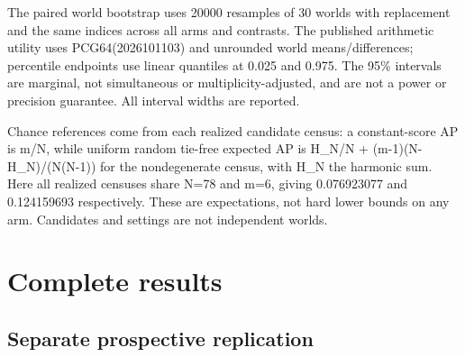 \documentclass{article}
\begin{document}
The paired world bootstrap uses 20000 resamples of 30 worlds with replacement and the same indices across all arms and contrasts. The published arithmetic utility uses PCG64(2026101103) and unrounded world means/differences; percentile endpoints use linear quantiles at 0.025 and 0.975. The 95\% intervals are marginal, not simultaneous or multiplicity-adjusted, and are not a power or precision guarantee. All interval widths are reported.

Chance references come from each realized candidate census: a constant-score AP is m/N, while uniform random tie-free expected AP is H\_N/N + (m-1)(N-H\_N)/(N(N-1)) for the nondegenerate census, with H\_N the harmonic sum. Here all realized censuses share N=78 and m=6, giving 0.076923077 and 0.124159693 respectively. These are expectations, not hard lower bounds on any arm. Candidates and settings are not independent worlds.

\section{Complete results}

\subsection{Separate prospective replication}

\begin{center}
\end{center}
\end{document}

